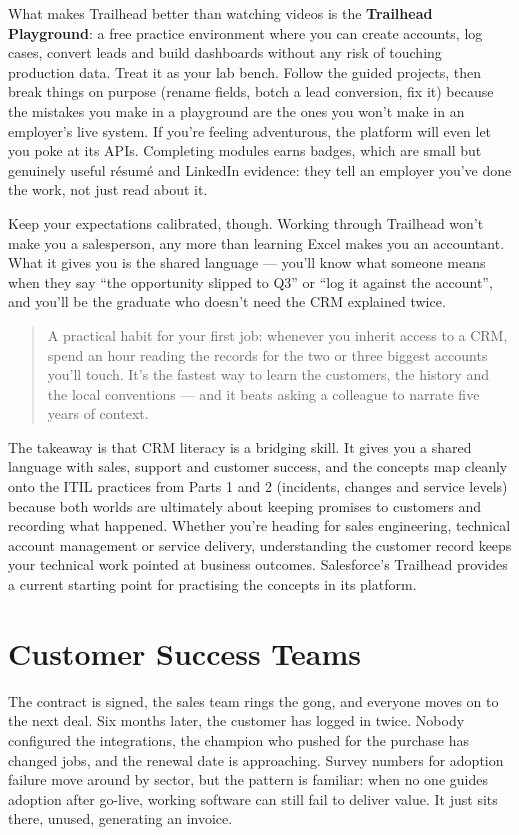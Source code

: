 What makes Trailhead better than watching videos is the \textbf{Trailhead Playground}: a free practice environment where you can create accounts, log cases, convert leads and build dashboards without any risk of touching production data. Treat it as your lab bench. Follow the guided projects, then break things on purpose (rename fields, botch a lead conversion, fix it) because the mistakes you make in a playground are the ones you won't make in an employer's live system. If you're feeling adventurous, the platform will even let you poke at its APIs. Completing modules earns badges, which are small but genuinely useful résumé and LinkedIn evidence: they tell an employer you've done the work, not just read about it.


Keep your expectations calibrated, though. Working through Trailhead won't make you a salesperson, any more than learning Excel makes you an accountant. What it gives you is the shared language — you'll know what someone means when they say ``the opportunity slipped to Q3'' or ``log it against the account'', and you'll be the graduate who doesn't need the CRM explained twice.



\begin{quote}\small
A practical habit for your first job: whenever you inherit access to a CRM, spend an hour reading the records for the two or three biggest accounts you'll touch. It's the fastest way to learn the customers, the history and the local conventions — and it beats asking a colleague to narrate five years of context.
\end{quote}


The takeaway is that CRM literacy is a bridging skill. It gives you a shared language with sales, support and customer success, and the concepts map cleanly onto the ITIL practices from Parts 1 and 2 (incidents, changes and service levels) because both worlds are ultimately about keeping promises to customers and recording what happened. Whether you're heading for sales engineering, technical account management or service delivery, understanding the customer record keeps your technical work pointed at business outcomes. Salesforce's Trailhead provides a current starting point for practising the concepts in its platform. \autocite{salesforce-crm}

\section{Customer Success Teams}
The contract is signed, the sales team rings the gong, and everyone moves on to the next deal. Six months later, the customer has logged in twice. Nobody configured the integrations, the champion who pushed for the purchase has changed jobs, and the renewal date is approaching. Survey numbers for adoption failure move around by sector, but the pattern is familiar: when no one guides adoption after go-live, working software can still fail to deliver value. It just sits there, unused, generating an invoice.


